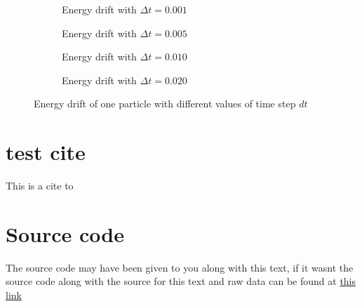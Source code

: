 \documentclass[10pt,a4paper,apm,twocolumn,secnumarabic,numerical,balancelastpage,nofootinbib,superscriptaddress]{revtex4-2}
\begin{document}
	\begin{figure*}[htb]
		\centering
		\begin{subfigure}{.45\textwidth}
			\scalebox{0.6}{}
			\caption{Energy drift with $\Delta t=0.001$}
		\end{subfigure}
		\begin{subfigure}{.45\textwidth}
			\scalebox{0.6}{}
			\caption{Energy drift with $\Delta t=0.005$}
		\end{subfigure}
		\begin{subfigure}{.45\textwidth}
			\scalebox{0.6}{}
			\caption{Energy drift with $\Delta t=0.010$}
		\end{subfigure}
		\begin{subfigure}{.45\textwidth}
			\scalebox{0.6}{}
			\caption{Energy drift with $\Delta t=0.020$}
		\end{subfigure}
		\caption{Energy drift of one particle with different values of time step $dt$}
	\end{figure*}
	
	\section{test cite}
	
		This is a cite to \citep{Agarwal2001}
	
	
	\appendix
	
		\section{Source code}
		
			The source code may have been given to you along with this text, if it wasnt the source code along with the source for this text and raw data can be found at \href{https://github.com/Mannen-I-Skogen/TFY4230-Numerical}{this link}
	
	
\end{document}
